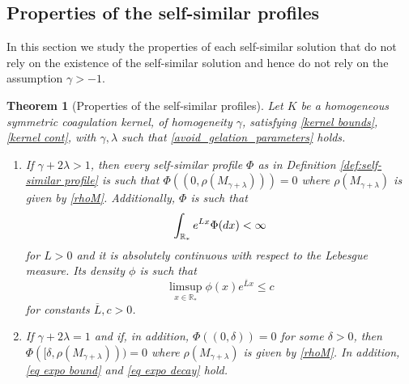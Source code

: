 \documentclass[11pt]{article}
\numberwithin{equation}{section}
\theoremstyle{plain}
\newtheorem{theorem}{Theorem}[section]
\newcommand{\der}{\textup{d}}
\begin{document}
\subsection{Properties of the self-similar profiles}
\label{sec:properties eqch}
In this section we study the properties of each self-similar solution that do not rely on the existence of the self-similar solution and hence do not rely on the assumption $\gamma >-1$. 
\begin{theorem}[Properties of the self-similar profiles] \label{thm:properties}
Let $K$ be a homogeneous symmetric coagulation kernel, of homogeneity $\gamma$, satisfying
\eqref{kernel bounds},  \eqref{kernel cont},  with $\gamma , \lambda $ such that  \eqref{avoid_gelation_parameters} holds. 
\begin{enumerate}
\item If $\gamma+2\lambda > 1$, 
then every self-similar profile $\Phi$ as in Definition \ref{def:self-similar profile} is such that $\Phi((0, \rho(M_{\gamma+\lambda}) ))=0$ where $\rho(M_{\gamma+\lambda}) $ is given by \eqref{rhoM}.  
Additionally, $\Phi$ is such that
\begin{equation} \label{eq expo bound}
\int_{\mathbb R_*} e^{Lx } \Phi(\der x) < \infty 
\end{equation}
for $L>0$ and it is absolutely continuous with respect to the Lebesgue measure. 
Its density $\phi $ is such that 
\begin{equation}\label{eq expo decay}
\limsup_{x \in \mathbb R_*} \phi(x) e^{ \overline{L} x} \leq c 
\end{equation} 
for constants $\overline{L} , c>0$. 
\item If $\gamma+ 2\lambda =1 $ and if, in addition, $\Phi((0, \delta))=0$ for some $\delta>0$, then $\Phi([\delta, \rho(M_{\gamma+\lambda})))=0$ where $ \rho(M_{\gamma+\lambda})$ is given by \eqref{rhoM}. In addition, \eqref{eq expo bound} and \eqref{eq expo decay} hold. 
\end{enumerate} 
\end{theorem}
\end{document}
